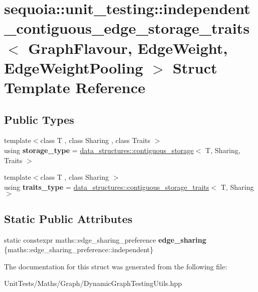 \hypertarget{structsequoia_1_1unit__testing_1_1independent__contiguous__edge__storage__traits}{}\section{sequoia\+::unit\+\_\+testing\+::independent\+\_\+contiguous\+\_\+edge\+\_\+storage\+\_\+traits$<$ Graph\+Flavour, Edge\+Weight, Edge\+Weight\+Pooling $>$ Struct Template Reference}
\label{structsequoia_1_1unit__testing_1_1independent__contiguous__edge__storage__traits}
\subsection*{Public Types}
\begin{DoxyCompactItemize}
\item 
\mbox{\label{structsequoia_1_1unit__testing_1_1independent__contiguous__edge__storage__traits_ac9b3aeff08e372a49d334f8840097319}} 
{\footnotesize template$<$class T , class Sharing , class Traits $>$ }\\using {\bfseries storage\+\_\+type} = \mbox{\hyperlink{classsequoia_1_1data__structures_1_1contiguous__storage}{data\+\_\+structures\+::contiguous\+\_\+storage}}$<$ T, Sharing, Traits $>$
\item 
\mbox{\label{structsequoia_1_1unit__testing_1_1independent__contiguous__edge__storage__traits_a4a8598463ad4e241906655400ad0949a}} 
{\footnotesize template$<$class T , class Sharing $>$ }\\using {\bfseries traits\+\_\+type} = \mbox{\hyperlink{structsequoia_1_1data__structures_1_1contiguous__storage__traits}{data\+\_\+structures\+::contiguous\+\_\+storage\+\_\+traits}}$<$ T, Sharing $>$
\end{DoxyCompactItemize}
\subsection*{Static Public Attributes}
\begin{DoxyCompactItemize}
\item 
\mbox{\label{structsequoia_1_1unit__testing_1_1independent__contiguous__edge__storage__traits_a8f62bd9c4d5485ba27622ed8a1169a48}} 
static constexpr maths\+::edge\+\_\+sharing\+\_\+preference {\bfseries edge\+\_\+sharing} \{maths\+::edge\+\_\+sharing\+\_\+preference\+::independent\}
\end{DoxyCompactItemize}


The documentation for this struct was generated from the following file\+:\begin{DoxyCompactItemize}
\item 
Unit\+Tests/\+Maths/\+Graph/Dynamic\+Graph\+Testing\+Utils.\+hpp\end{DoxyCompactItemize}
